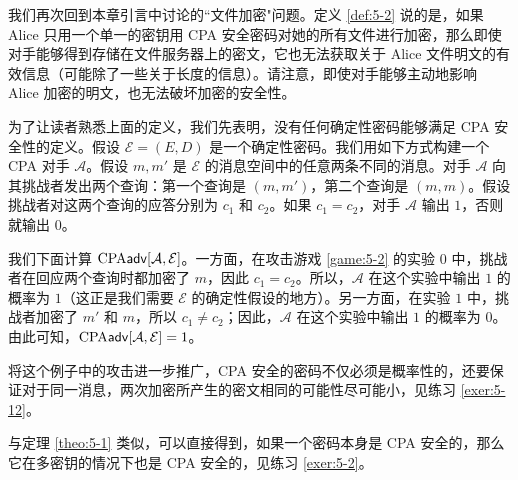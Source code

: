 我们再次回到本章引言中讨论的``文件加密"问题。定义 \ref{def:5-2} 说的是，如果 Alice 只用一个单一的密钥用 CPA 安全密码对她的所有文件进行加密，那么即使对手能够得到存储在文件服务器上的密文，它也无法获取关于 Alice 文件明文的有效信息（可能除了一些关于长度的信息）。请注意，即使对手能够主动地影响 Alice 加密的明文，也无法破坏加密的安全性。

\begin{example}\label{exmp:5-1}
为了让读者熟悉上面的定义，我们先表明，没有任何确定性密码能够满足 CPA 安全性的定义。假设 $\mathcal{E}=(E,D)$ 是一个确定性密码。我们用如下方式构建一个 CPA 对手 $\mathcal{A}$。假设 $m,m'$ 是 $\mathcal{E}$ 的消息空间中的任意两条不同的消息。对手 $\mathcal{A}$ 向其挑战者发出两个查询：第一个查询是 $(m,m')$，第二个查询是 $(m,m)$。假设挑战者对这两个查询的应答分别为 $c_1$ 和 $c_2$。如果 $c_1=c_2$，对手 $\mathcal{A}$ 输出 $1$，否则就输出 $0$。

我们下面计算 ${\rm CPA}\mathsf{adv}[\mathcal{A}, \mathcal{E}]$。一方面，在攻击游戏 \ref{game:5-2} 的实验 $0$ 中，挑战者在回应两个查询时都加密了 $m$，因此 $c_1=c_2$。所以，$\mathcal{A}$ 在这个实验中输出 $1$ 的概率为 $1$（这正是我们需要 $\mathcal{E}$ 的确定性假设的地方）。另一方面，在实验 $1$ 中，挑战者加密了 $m'$ 和 $m$，所以 $c_1\neq c_2$；因此，$\mathcal{A}$ 在这个实验中输出 $1$ 的概率为 $0$。由此可知，${\rm CPA}\mathsf{adv}[\mathcal{A}, \mathcal{E}]=1$。

将这个例子中的攻击进一步推广，CPA 安全的密码不仅必须是概率性的，还要保证对于同一消息，两次加密所产生的密文相同的可能性尽可能小，见练习 \ref{exer:5-12}。
\end{example}

\begin{remark}\label{remark:5-1}
与定理 \ref{theo:5-1} 类似，可以直接得到，如果一个密码本身是 CPA 安全的，那么它在多密钥的情况下也是 CPA 安全的，见练习 \ref{exer:5-2}。
\end{remark}